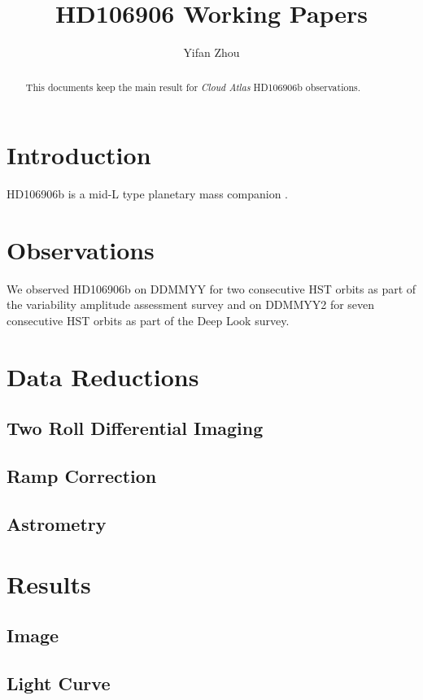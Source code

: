 \documentclass[modern]{aastex62}
\begin{document}
\title{HD106906 Working Papers}


\author{Yifan Zhou}

\begin{abstract}
  This documents keep the main result for \emph{Cloud Atlas} HD106906b \citep{Bailey2013} observations.
\end{abstract}

\keywords{}

\section{Introduction}
HD106906b is a mid-L type planetary mass companion \citep{Bailey2013}.

\section{Observations}
We observed HD106906b on DDMMYY for two consecutive HST orbits as part of the variability amplitude assessment survey and on DDMMYY2 for seven consecutive HST orbits as part of the Deep Look survey. 

\section{Data Reductions}
\subsection{Two Roll Differential Imaging}
\subsection{Ramp Correction}
\subsection{Astrometry}

\section{Results}
\subsection{Image}
\subsection{Light Curve}
\end{document}
